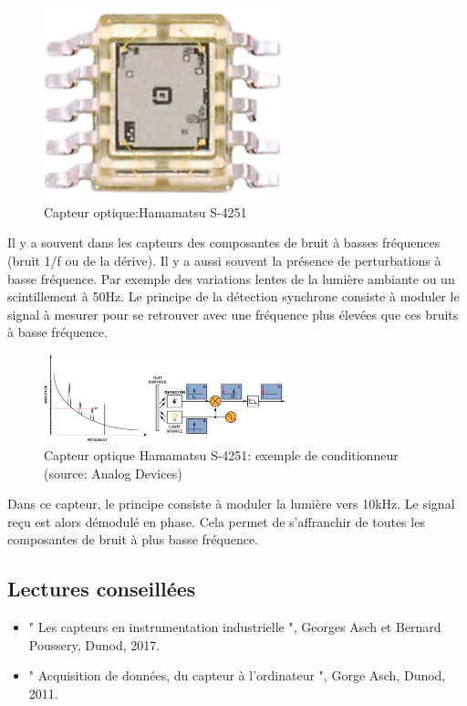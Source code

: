 \begin{figure}[h!]
\centering
\includegraphics[width=7cm]{assets/figures/4_2_14_Capteur_optique_Hamamatsu_S_4251.PNG}
\caption{Capteur optique:Hamamatsu S-4251}
\label{fig:Capteur_optique_Hamamatsu_S_4251}
\end{figure}

Il y a souvent dans les capteurs des composantes de bruit à basses fréquences (bruit 1/f ou de la dérive). Il y a aussi souvent la présence de perturbations à basse fréquence. Par exemple des variations lentes de la lumière ambiante ou un scintillement à 50Hz. Le principe de la détection synchrone consiste à moduler le signal à mesurer pour se retrouver avec une fréquence plus élevées que ces bruits à basse fréquence.

\begin{figure}[h!]
\centering
\includegraphics[width=7cm]{assets/figures/4_2_14_Capteur_optique_Hamamatsu_S_4251_conditionneur.PNG}
\caption{Capteur optique Hamamatsu S-4251: exemple de conditionneur (source: Analog Devices)}
\label{fig:Capteur_optique_Hamamatsu_S_4251_conditionneur}
\end{figure}

Dans ce capteur, le principe consiste à moduler la lumière vers 10kHz. Le signal reçu est alors démodulé en phase. Cela permet de s'affranchir de toutes les composantes de bruit à plus basse fréquence.

\subsection{Lectures conseillées}

\begin{itemize}\itemsep1pt
\renewcommand{\labelitemi}{$\bullet$}
\item " Les capteurs en instrumentation industrielle ", Georges Asch et Bernard Poussery, Dunod, 2017.
\item " Acquisition de données, du capteur à l'ordinateur ", Gorge Asch, Dunod, 2011.
\end{itemize}

%
